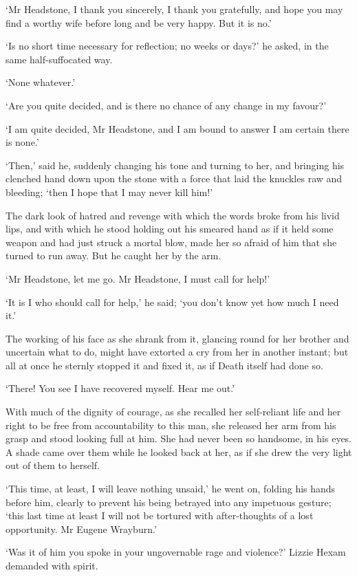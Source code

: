 ‘Mr Headstone, I thank you sincerely, I thank you gratefully, and hope
you may find a worthy wife before long and be very happy. But it is no.’

‘Is no short time necessary for reflection; no weeks or days?’ he asked,
in the same half-suffocated way.

‘None whatever.’

‘Are you quite decided, and is there no chance of any change in my
favour?’

‘I am quite decided, Mr Headstone, and I am bound to answer I am certain
there is none.’

‘Then,’ said he, suddenly changing his tone and turning to her, and
bringing his clenched hand down upon the stone with a force that laid
the knuckles raw and bleeding; ‘then I hope that I may never kill him!’

The dark look of hatred and revenge with which the words broke from his
livid lips, and with which he stood holding out his smeared hand as
if it held some weapon and had just struck a mortal blow, made her so
afraid of him that she turned to run away. But he caught her by the arm.

‘Mr Headstone, let me go. Mr Headstone, I must call for help!’

‘It is I who should call for help,’ he said; ‘you don’t know yet how
much I need it.’

The working of his face as she shrank from it, glancing round for her
brother and uncertain what to do, might have extorted a cry from her in
another instant; but all at once he sternly stopped it and fixed it, as
if Death itself had done so.

‘There! You see I have recovered myself. Hear me out.’

With much of the dignity of courage, as she recalled her self-reliant
life and her right to be free from accountability to this man, she
released her arm from his grasp and stood looking full at him. She had
never been so handsome, in his eyes. A shade came over them while
he looked back at her, as if she drew the very light out of them to
herself.

‘This time, at least, I will leave nothing unsaid,’ he went on, folding
his hands before him, clearly to prevent his being betrayed into any
impetuous gesture; ‘this last time at least I will not be tortured with
after-thoughts of a lost opportunity. Mr Eugene Wrayburn.’

‘Was it of him you spoke in your ungovernable rage and violence?’ Lizzie
Hexam demanded with spirit.

